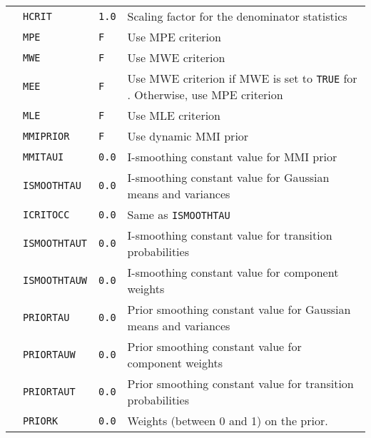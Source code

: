 \begin{center}
\begin{supertabular}{|p{1.8cm}|l|l|p{6.6cm}|}
& \texttt{HCRIT} & \texttt{1.0} & Scaling factor for the denominator statistics \\ 


& \texttt{MPE} & \texttt{F} & Use MPE criterion \\ 


& \texttt{MWE} & \texttt{F} & Use MWE criterion \\ 


& \texttt{MEE} & \texttt{F} & Use MWE criterion if MWE is set to \texttt{TRUE} for . Otherwise, use MPE criterion \\ 


& \texttt{MLE} & \texttt{F} & Use MLE criterion \\ 


& \texttt{MMIPRIOR} & \texttt{F} & Use dynamic MMI prior \\ 


& \texttt{MMITAUI} & \texttt{0.0} & I-smoothing constant value for MMI prior \\ 


& \texttt{ISMOOTHTAU} & \texttt{0.0} & I-smoothing constant value for Gaussian means and variances \\ 


& \texttt{ICRITOCC} & \texttt{0.0} & Same as \texttt{ISMOOTHTAU} \\ 


& \texttt{ISMOOTHTAUT} & \texttt{0.0} & I-smoothing constant value for transition probabilities \\ 


& \texttt{ISMOOTHTAUW} & \texttt{0.0} & I-smoothing constant value for component weights \\ 


& \texttt{PRIORTAU} & \texttt{0.0} & Prior smoothing constant value for Gaussian means and variances \\ 


& \texttt{PRIORTAUW} & \texttt{0.0} & Prior smoothing constant value for component weights \\ 


& \texttt{PRIORTAUT} & \texttt{0.0} & Prior smoothing constant value for transition probabilities \\ 


& \texttt{PRIORK} & \texttt{0.0} & Weights (between 0 and 1) on the prior. \\ 



\end{supertabular}
\end{center}
